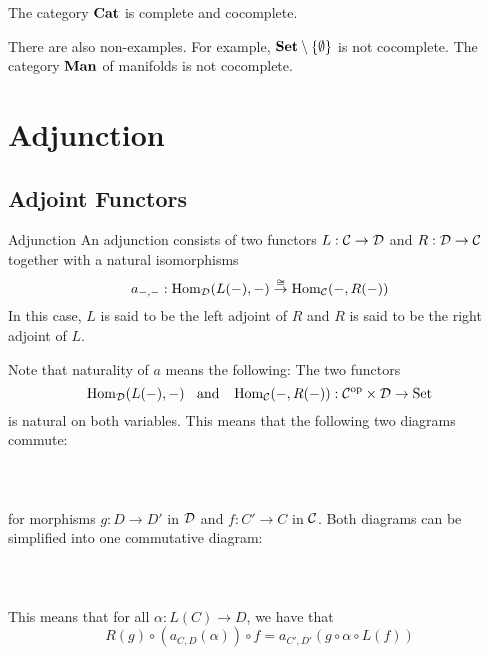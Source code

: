 \documentclass[a4paper]{article}
\begin{document}
\begin{prp}{}{} The category $\bold{Cat}$ is complete and cocomplete. 
\end{prp}

There are also non-examples. For example, $\bold{Set}\setminus\{\emptyset\}$ is not cocomplete. The category $\bold{Man}$ of manifolds is not cocomplete. 

\pagebreak
\section{Adjunction}
\subsection{Adjoint Functors}
\begin{defn}{Adjunction}{} An adjunction consists of two functors $L:\mathcal{C}\to\mathcal{D}$ and $R:\mathcal{D}\to\mathcal{C}$ together with a natural isomorphisms $$a_{-,-}:\operatorname{Hom}_{\mathcal{D}}(L(-),-)\overset{\cong}{\to}\operatorname{Hom}_{\mathcal{C}}(-,R(-))$$ In this case, $L$ is said to be the left adjoint of $R$ and $R$ is said to be the right adjoint of $L$. 
\end{defn}

Note that naturality of $a$ means the following: The two functors $$\operatorname{Hom}_{\mathcal{D}}(L(-),-)\;\;\text{ and }\;\;\operatorname{Hom}_{\mathcal{C}}(-,R(-)):\mathcal{C}^\text{op}\times\mathcal{D}\to\text{Set}$$ is natural on both variables. This means that the following two diagrams commute: \\~\\
 \\~\\
for morphisms $g:D\to D'$ in $\mathcal{D}$ and $f:C'\to C$ in $\mathcal{C}$. Both diagrams can be simplified into one commutative diagram: \\~\\
 \\~\\
This means that for all $\alpha:L(C)\to D$, we have that $$R(g)\circ\left(a_{C,D}(\alpha)\right)\circ f=a_{C',D'}\left(g\circ\alpha\circ L(f)\right)$$
\end{document}
